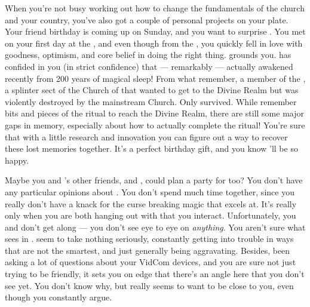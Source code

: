 \documentclass[char]{GL2020}
\begin{document}
When you're not busy working out how to change the fundamentals of the church and your country, you've also got a couple of personal projects on your plate. Your friend \cDisney{\intros} birthday is coming up on Sunday, and you want to surprise \cDisney{\them}. You met \cDisney{} on your first day at the \pSc{}, and even though \cDisney{\theyare} from the \pFarm{}, you quickly fell in love with \cDisney{\their} goodness, optimism, and core belief in doing the right thing. \cDisney{} grounds you. \cDisney{} has confided in you (in strict confidence) that — remarkably — \cDisney{\theywere} actually awakened recently from 200 years of magical sleep! From what \cDisney{\they} remember\cDisney{\verbs}, \cDisney{\theyare} a member of the \cDisneySect{\intro}, a splinter sect of the Church of \cFarmGod{\intro} that wanted to get to the Divine Realm but was violently destroyed by the mainstream Church. Only \cDisney{\they} survived. While \cDisney{\they} remember\cDisney{\verbs} bits and pieces of the ritual to reach the Divine Realm, there are still some major gaps in \cDisney{\their} memory, especially about how to actually complete the ritual! You're sure that with a little research and innovation you can figure out a way to recover these lost memories together. It's a perfect birthday gift, and you know \cDisney{\they}'ll be so happy.

Maybe you and \cDisney{}'s other friends, \cAdopted{\intro} and \cPirateChild{\intro}, could plan a party for \cDisney{\them} too? You don’t have any particular opinions about \cAdopted{}. You don’t spend much time together, since you really don’t have a knack for the curse breaking magic that \cAdopted{} excels at. It’s really only when you are both hanging out with \cDisney{} that you interact. Unfortunately, you and \cPirateChild{} don't get along — you don't see eye to eye on \emph{anything}. You aren't sure what \cDisney{} sees in \cPirateChild{\them}. \cPirateChild{\They} seem\cPirateChild{\verbs} to take nothing seriously, constantly getting into trouble in ways that are not the smartest, and just generally being aggravating. Besides, \cPirateChild{\theyhave} been asking a lot of questions about your VidCom devices, and you are sure \cPirateChild{\theyare} not just trying to be friendly, it sets you on edge that there’s an angle here that you don’t see yet. You don’t know why, but \cPirateChild{} really seems to want to be close to you, even though you constantly argue.
\end{document}
